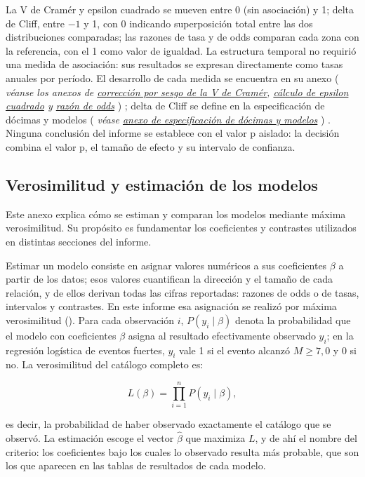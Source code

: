 \documentclass[
  spanish,
  letterpaper,
  DIV=11,
  numbers=noendperiod]{scrartcl}
\newcommand{\asesoriaParenRef}[1]{%
  \textnormal{\textcolor{asesoriaTextColor}{(}}%
  {\hypersetup{linkcolor=asesoriaLinkColor,urlcolor=asesoriaLinkColor,citecolor=asesoriaLinkColor}\textcolor{asesoriaTextColor}{\emph{#1}}}%
  \textnormal{\textcolor{asesoriaTextColor}{)}}%
}
\begin{document}
La V de Cramér y epsilon cuadrado se mueven entre 0 (sin asociación) y
1; delta de Cliff, entre \(-1\) y 1, con 0 indicando superposición total
entre las dos distribuciones comparadas; las razones de tasa y de odds
comparan cada zona con la referencia, con el 1 como valor de igualdad.
La estructura temporal no requirió una medida de asociación: sus
resultados se expresan directamente como tasas anuales por período. El
desarrollo de cada medida se encuentra en su anexo
\asesoriaParenRef{véanse los anexos de \hyperref[sec-anexo-cramer]{corrección por sesgo de la V de Cramér}, \hyperref[sec-anexo-epsilon]{cálculo de epsilon cuadrado} y \hyperref[sec-anexo-or]{razón de odds}};
delta de Cliff se define en la especificación de dócimas y modelos
\asesoriaParenRef{véase \hyperref[sec-anexo-especificacion]{anexo de especificación de dócimas y modelos}}.
Ninguna conclusión del informe se establece con el valor p aislado: la
decisión combina el valor p, el tamaño de efecto y su intervalo de
confianza.

\subsection{Verosimilitud y estimación de los
modelos}\label{sec-anexo-verosimilitud}

Este anexo explica cómo se estiman y comparan los modelos mediante
máxima verosimilitud. Su propósito es fundamentar los coeficientes y
contrastes utilizados en distintas secciones del informe.

Estimar un modelo consiste en asignar valores numéricos a sus
coeficientes \(\beta\) a partir de los datos; esos valores cuantifican
la dirección y el tamaño de cada relación, y de ellos derivan todas las
cifras reportadas: razones de odds o de tasas, intervalos y contrastes.
En este informe esa asignación se realizó por máxima verosimilitud
(). Para cada observación \(i\),
\(P(y_i \mid \beta)\) denota la probabilidad que el modelo con
coeficientes \(\beta\) asigna al resultado efectivamente observado
\(y_i\); en la regresión logística de eventos fuertes, \(y_i\) vale 1 si
el evento alcanzó \(M \geq 7{,}0\) y 0 si no. La verosimilitud del
catálogo completo es:

\[
L(\beta)=\prod_{i=1}^{n} P(y_i \mid \beta),
\]

es decir, la probabilidad de haber observado exactamente el catálogo que
se observó. La estimación escoge el vector \(\hat\beta\) que maximiza
\(L\), y de ahí el nombre del criterio: los coeficientes bajo los cuales
lo observado resulta más probable, que son los que aparecen en las
tablas de resultados de cada modelo.
\end{document}
